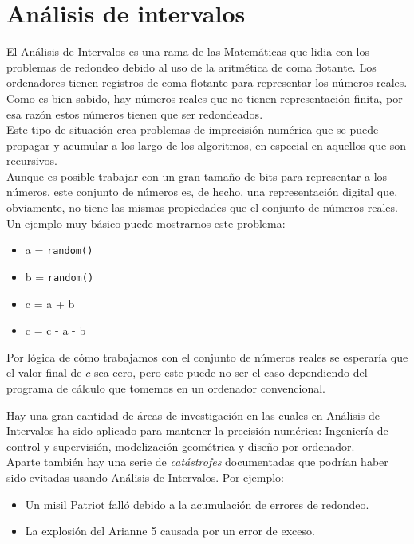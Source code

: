 \chapter{Análisis de intervalos}

El Análisis de Intervalos es una rama de las Matemáticas que lidia con los problemas de redondeo debido al uso de la aritmética de coma flotante. Los ordenadores tienen registros de coma flotante para representar los números reales. Como es bien sabido, hay números reales que no tienen representación finita, por esa razón estos números tienen que ser redondeados.
\\Este tipo de situación crea problemas de imprecisión numérica que se puede propagar y acumular a los largo de los algoritmos, en especial en aquellos que son recursivos.
\\Aunque es posible trabajar con un gran tamaño de bits para representar a los números, este conjunto de números es, de hecho, una representación digital que, obviamente, no tiene las mismas propiedades que el conjunto de números reales.
\\Un ejemplo muy básico puede mostrarnos este problema:
\begin{itemize}
	\item a = \texttt{random()}
	\item b = \texttt{random()}
	\item c = a + b
	\item c = c - a - b
\end{itemize}

Por lógica de cómo trabajamos con el conjunto de números reales se esperaría que el valor final de $c$ sea cero, pero este puede no ser el caso dependiendo del programa de cálculo que tomemos en un ordenador convencional.

Hay una gran cantidad de áreas de investigación en las cuales en Análisis de Intervalos ha sido aplicado para mantener la precisión numérica: Ingeniería de control y supervisión, modelización geométrica y diseño por ordenador.
\\Aparte también hay una serie de{ \em catástrofes} documentadas que podrían haber sido evitadas usando Análisis de Intervalos. Por ejemplo:
\begin{itemize}
	\item Un misil Patriot falló debido a la acumulación de errores de redondeo.
	\item La explosión del Arianne 5 causada por un error de exceso.
\end{itemize}

